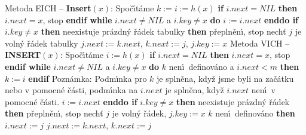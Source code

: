 \flushpar Metoda EICH -- {\bf Insert$(x)$}:\newline 
Spo\v c\'\i t\'ame $k:=i:=h(x)$\newline 
{\bf if} $i.next=NIL$ {\bf then} $i.next=x$, stop {\bf endif\newline 
while} $i.next\ne NIL$ a $i.key\ne x$ {\bf do} $i:=i.next$ {\bf enddo\newline 
if} $i.key\ne x$ {\bf then}\newline 
\phantom{---}{\bf if} neexistuje pr\'azdn\'y \v r\'adek tabulky {\bf then}\newline 
\phantom{------}p\v repln\v en\'\i, stop\newline 
\phantom{---}{\bf else}\newline 
\phantom{------}nech\v t $j$ je voln\'y \v r\'adek tabulky\newline 
\phantom{------}$j.next:=k.next$, $k.next:=j$, $j.key:=x$\newline 
\phantom{---}{\bf endif\newline 
endif
\medskip

}\flushpar Metoda VICH -- {\bf INSERT$(x)$}:\newline 
Spo\v c\'\i t\'ame $i:=h(x)$\newline 
{\bf if} $i.next=NIL$ {\bf then} $i.next=x$, stop {\bf endif\newline 
while} $i.next\ne NIL$ a $i.key\ne x$ {\bf do}\newline 
\phantom{---}{\bf if} $k$ nen\'\i\ definov\'ano a $i.next<m$ {\bf then} $
k:=i$ {\bf endif\newline }
Pozn\'amka: Podm\'\i nka pro $k$ je spln\v ena, kdy\v z jsme byli na 
za\v c\'atku nebo v pomocn\'e \v c\'asti, podm\'\i nka na $i.next$ je spln\v ena, 
kdy\v z $i.next$ nen\'\i\ v pomocn\'e \v c\'asti.\newline 
\phantom{---}$i:=i.next$\newline 
{\bf enddo\newline 
if} $i.key\ne x$ {\bf then}\newline 
\phantom{---}{\bf if} neexistuje pr\'azdn\'y \v r\'adek {\bf then}\newline 
\phantom{------}p\v repln\v en\'\i, stop\newline 
\phantom{---}{\bf else}\newline 
\phantom{------}nech\v t $j$ je voln\'y \v r\'adek, $j.key
:=x$\newline 
\phantom{------}{\bf if} $k$ nen\'\i\ definov\'ano {\bf then}\newline 
\phantom{---------}$i.next:=j$\newline 
\phantom{------}{\bf else}\newline 
\phantom{---------}$j.next:=k.next$, $k.next:=j$\newline 
\phantom{------}{\bf endif}\newline 
\phantom{---}{\bf endif\newline 
endif}
\bigskip

